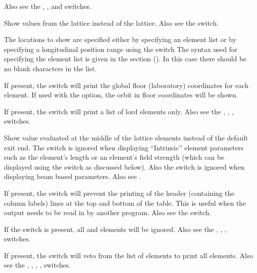 {{{{{{{{{\begin{description}
Also see the , , and  switches.
%
\item[-design] \Newline
Show values from the  lattice instead of the  lattice. Also see the 
switch.
%
\item[<element_list>] \Newline
The locations to show are specified either by specifying an element list or by specifying a
longitudinal position range using the  switch The syntax used for specifying the element list
is given in the  section (). In this case
there should be no blank characters in the list.
%
\item[-floor_coords] \Newline
If present, the  switch will print the global floor (laboratory) coordinates for
each element. If used with the  option, the orbit in floor coordinates will be shown.
%
\item[-lords] \Newline
If present, the  switch will print a list of lord elements only. Also see the
, , ,  switches.
%
\item[-middle] \Newline
Show value evaluated at the middle of the lattice elements instead of the default exit end.
The  switch is ignored when displaying ``Intrinsic'' element
parameters such as the element's length or an element's field strength (which can be displayed using
the  switch as discussed below). Also the  switch is ignored when
displaying beam based parameters. Also see .
%
\item[-no_label_lines] \Newline
If present, the  switch will prevent the printing of the header (containing the
column labels) lines at the top and bottom of the table.  This is useful when the output needs to be
read in by another program. Also see the  switch.
%
\item[-no_slaves] \Newline
If the  switch is present, all  and  elements
will be ignored. Also see the , , , 
switches.
%
\item[-no_super_slaves] \Newline
If present, the  switch will veto from the list of elements to print all
 elements. Also see the , , , ,
 switches.
%
\item[-no_tail_lines] \Newline

\end{description}}}}}}}}}}
